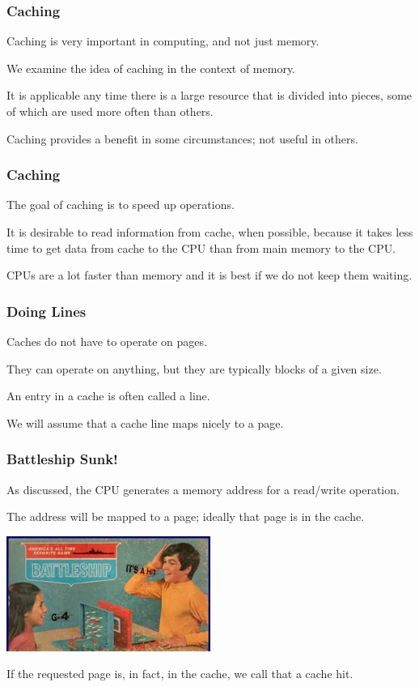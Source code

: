 \begin{frame}
\frametitle{Caching}

Caching is very important in computing, and not just memory. 

We examine the idea of caching in the context of memory.

It is applicable any time there is a large resource that is divided into pieces, some of which are used more often than others. 

Caching provides a benefit in some circumstances; not useful in others. 


\end{frame}

\begin{frame}
\frametitle{Caching}

The goal of caching is to speed up operations. 

It is desirable to read information from cache, when possible, because it takes less time to get data from cache to the CPU than from main memory to the CPU. 

CPUs are a lot faster than memory and it is best if we do not keep them waiting.

\end{frame}

\begin{frame}
\frametitle{Doing Lines}

Caches do not have to operate on pages. 

They can operate on anything, but they are typically blocks of a given size. 

An entry in a cache is often called a \alert{line}. 

We will assume that a cache line maps nicely to a page.

\end{frame}

\begin{frame}
\frametitle{Battleship Sunk!}

As discussed, the CPU generates a memory address for a read/write operation. 

The address will be mapped to a page; ideally that page is in the cache.

\begin{center}
	\includegraphics[width=0.5\textwidth]{images/battleship.jpg}
\end{center}

If the requested page is, in fact,  in the cache, we call that a cache \alert{hit}.

\end{frame}

